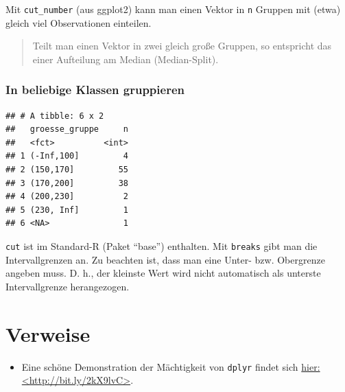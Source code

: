 \documentclass[12pt,ngerman,paper=a4,pagesize,DIV=13]{scrreprt}
\newenvironment{Shaded}{\begin{snugshade}}{\end{snugshade}}
\newcommand{\DataTypeTok}[1]{\textcolor[rgb]{0.13,0.29,0.53}{#1}}
\newcommand{\DecValTok}[1]{\textcolor[rgb]{0.00,0.00,0.81}{#1}}
\newcommand{\KeywordTok}[1]{\textcolor[rgb]{0.13,0.29,0.53}{\textbf{#1}}}
\newcommand{\NormalTok}[1]{#1}
\newcommand{\OperatorTok}[1]{\textcolor[rgb]{0.81,0.36,0.00}{\textbf{#1}}}
\newcommand{\OtherTok}[1]{\textcolor[rgb]{0.56,0.35,0.01}{#1}}
\newcommand{\StringTok}[1]{\textcolor[rgb]{0.31,0.60,0.02}{#1}}
\providecommand{\tightlist}{%
  \setlength{\itemsep}{0pt}\setlength{\parskip}{0pt}}
\begin{document}
Mit \texttt{cut\_number} (aus ggplot2) kann man einen Vektor in
\texttt{n} Gruppen mit (etwa) gleich viel Observationen einteilen.

\begin{quote}
Teilt man einen Vektor in zwei gleich große Gruppen, so entspricht das
einer Aufteilung am Median (Median-Split).
\end{quote}

\hypertarget{in-beliebige-klassen-gruppieren}{%
\subsubsection{In beliebige Klassen
gruppieren}\label{in-beliebige-klassen-gruppieren}}

\begin{Shaded}
\end{Shaded}

\begin{verbatim}
## # A tibble: 6 x 2
##   groesse_gruppe     n
##   <fct>          <int>
## 1 (-Inf,100]         4
## 2 (150,170]         55
## 3 (170,200]         38
## 4 (200,230]          2
## 5 (230, Inf]         1
## 6 <NA>               1
\end{verbatim}

\texttt{cut} ist im Standard-R (Paket \enquote{base}) enthalten. Mit
\texttt{breaks} gibt man die Intervallgrenzen an. Zu beachten ist, dass
man eine Unter- bzw. Obergrenze angeben muss. D. h., der kleinste Wert
wird nicht automatisch als unterste Intervallgrenze herangezogen.

\hypertarget{verweise}{%
\section{Verweise}\label{verweise}}

\begin{itemize}
\tightlist
\item
  Eine schöne Demonstration der Mächtigkeit von \texttt{dplyr} findet
  sich \href{http://bit.ly/2kX9lvC}{hier:
  \textless{}http://bit.ly/2kX9lvC\textgreater{}}.
\end{itemize}
\end{document}
